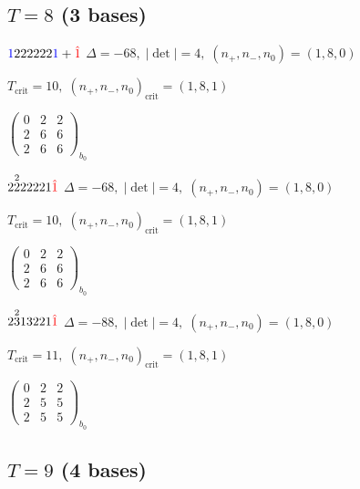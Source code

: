 \documentclass[10pt]{article}
\begin{document}
\subsection*{$T = 8$ \quad (3 bases)}
\smallskip

$\textcolor{blue}{1}222222\textcolor{blue}{1}+\textcolor{red}{\hat{1}}$ \quad $\Delta=-68,\; |\det|=4,\; (n_+,n_-,n_0)=(1,8,0)$

\hspace{1em}$T_{\text{crit}}=10,\; (n_+,n_-,n_0)_{\text{crit}}=(1,8,1)$

\hspace{2em}$\left(\begin{smallmatrix}0 & 2 & 2 \\ 2 & 6 & 6 \\ 2 & 6 & 6\end{smallmatrix}\right)_{\!b_0}$

\smallskip

$2\overset{2}{2}22221\textcolor{red}{\hat{1}}$ \quad $\Delta=-68,\; |\det|=4,\; (n_+,n_-,n_0)=(1,8,0)$

\hspace{1em}$T_{\text{crit}}=10,\; (n_+,n_-,n_0)_{\text{crit}}=(1,8,1)$

\hspace{2em}$\left(\begin{smallmatrix}0 & 2 & 2 \\ 2 & 6 & 6 \\ 2 & 6 & 6\end{smallmatrix}\right)_{\!b_0}$

\smallskip

$2\overset{2}{3}13221\textcolor{red}{\hat{1}}$ \quad $\Delta=-88,\; |\det|=4,\; (n_+,n_-,n_0)=(1,8,0)$

\hspace{1em}$T_{\text{crit}}=11,\; (n_+,n_-,n_0)_{\text{crit}}=(1,8,1)$

\hspace{2em}$\left(\begin{smallmatrix}0 & 2 & 2 \\ 2 & 5 & 5 \\ 2 & 5 & 5\end{smallmatrix}\right)_{\!b_0}$


\subsection*{$T = 9$ \quad (4 bases)}
\smallskip
\end{document}
